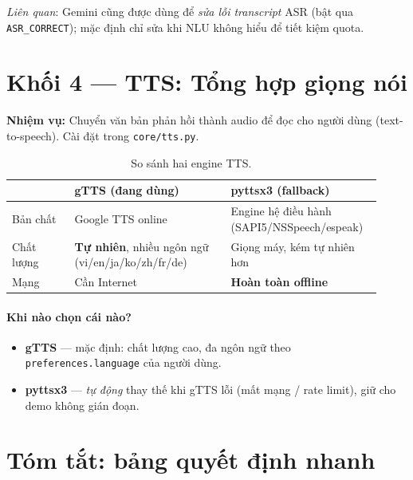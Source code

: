 \documentclass[12pt,a4paper]{article}
\newcommand{\role}[1]{\par\smallskip\noindent\textbf{\textcolor{hdr}{Nhiệm vụ:}} #1\par\smallskip}
\begin{document}
\noindent\textit{Liên quan}: Gemini cũng được dùng để \emph{sửa lỗi transcript}
ASR (bật qua \texttt{ASR\_CORRECT}); mặc định chỉ sửa khi NLU không hiểu để tiết
kiệm quota.

\section{Khối 4 --- TTS: Tổng hợp giọng nói}
\role{Chuyển văn bản phản hồi thành audio để đọc cho người dùng (text-to-speech).
Cài đặt trong \texttt{core/tts.py}.}

\begin{table}[H]
\centering
\caption{So sánh hai engine TTS.}
\small
\begin{tabular}{p{0.16\linewidth}p{0.40\linewidth}p{0.36\linewidth}}
\toprule
& \textbf{gTTS} (đang dùng) & \textbf{pyttsx3} (fallback) \\
\midrule
Bản chất & Google TTS online & Engine hệ điều hành (SAPI5/NSSpeech/espeak) \\
Chất lượng & \textbf{Tự nhiên}, nhiều ngôn ngữ (vi/en/ja/ko/zh/fr/de) & Giọng máy,
kém tự nhiên hơn \\
Mạng & Cần Internet & \textbf{Hoàn toàn offline} \\
\bottomrule
\end{tabular}
\end{table}

\paragraph{Khi nào chọn cái nào?}
\begin{itemize}
  \item \textbf{gTTS} --- mặc định: chất lượng cao, đa ngôn ngữ theo
  \texttt{preferences.language} của người dùng.
  \item \textbf{pyttsx3} --- \emph{tự động} thay thế khi gTTS lỗi (mất mạng / rate
  limit), giữ cho demo không gián đoạn.
\end{itemize}

\section{Tóm tắt: bảng quyết định nhanh}
\end{document}
